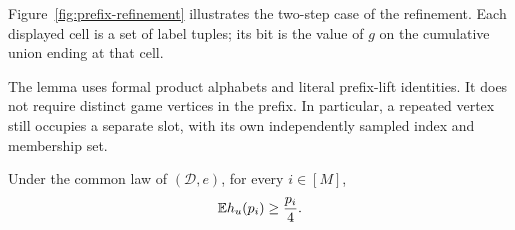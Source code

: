 Figure~\ref{fig:prefix-refinement} illustrates the two-step case of the
refinement. Each displayed cell is a set of label tuples; its bit is
the value of $g$ on the cumulative union ending at that cell.


The lemma uses formal product alphabets and literal prefix-lift
identities.  It does not require distinct game vertices in the
prefix.  In particular, a repeated vertex still occupies a
separate slot, with its own independently sampled index and
membership set.

\begin{proposition}
\label{prop:prefix-lower-bound}
Under the common law of $(\mathcal D,e)$, for every $i\in[M]$,
\begin{equation}
  \mathbb E h_u(p_i)\ge\frac{p_i}{4}.
  \label{eq:prefix-lower-bound}
\end{equation}
\end{proposition}

